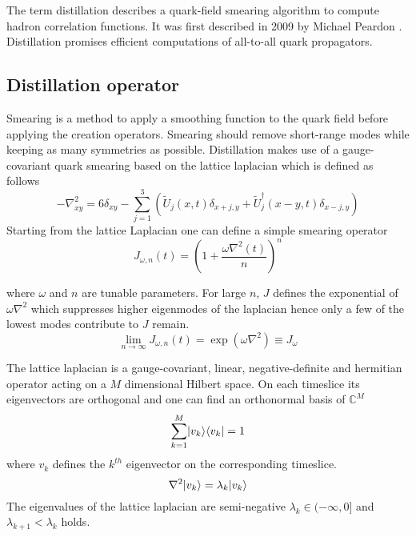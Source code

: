 	
The term distillation describes a quark-field smearing algorithm to compute hadron correlation functions. It was first described in 2009 by Michael Peardon \cite{distillation_paper}. Distillation promises efficient computations of all-to-all quark propagators.\\

\subsection{Distillation operator}
    Smearing is a method to apply a smoothing function to the quark field before applying the creation operators. Smearing should remove short-range modes while keeping as many symmetries as possible. Distillation makes use of a gauge-covariant quark smearing based on the lattice laplacian which is defined as follows
	\begin{equation}
	    -\nabla^2_{xy} = 6\delta_{xy} - \sum^3_{j=1}(\tilde{U}_j(x,t)\delta_{x+j,y} + \tilde{U}^\dagger_j(x-y,t)\delta_{x-j,y})
	\end{equation}
	\noindent
	Starting from the lattice Laplacian one can define a simple smearing operator
	\begin{equation}
	    J_{\omega,n}(t) = (1+\frac{\omega\nabla^2(t)}{n})^n
	\end{equation}
	
	\noindent
	where $\omega$ and $n$ are tunable parameters. For large $n$, $J$ defines the exponential of $\omega\nabla^2$ which suppresses higher eigenmodes of the laplacian hence only a few of the lowest modes contribute to $J$ remain. %
	\begin{equation}
        \lim_{n\rightarrow\infty} J_{\omega,n}(t) = \exp(\omega\nabla^2) \equiv J_\omega
	\end{equation}
	
	\noindent
    The lattice laplacian is a gauge-covariant, linear, negative-definite and hermitian operator acting on a $M$ dimensional Hilbert space. On each timeslice its eigenvectors are orthogonal and one can find an orthonormal basis of $\mathbb{C}^M$
    \cite{bachelor_thesis_jan}
    \begin{equation}\label{othonormal_eigenvectors}
        \sum^M_{k=1}\lvert v_k\rangle\langle v_k\rvert = 1
    \end{equation}
    where $v_k$ defines the $k^{th}$ eigenvector on the corresponding timeslice.
    \begin{equation}
        \nabla^2\lvert v_k\rangle = \lambda_k\lvert v_k\rangle
    \end{equation}
    The eigenvalues of the lattice laplacian are semi-negative $\lambda_k \in (-\infty,0]$ and $\lambda_{k+1} < \lambda_k$ holds.\\
    
